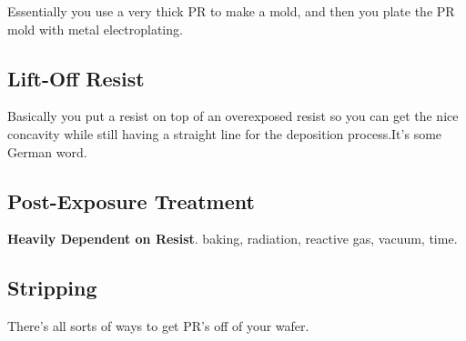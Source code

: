 \documentclass[fleqn]{report}
\begin{document}
Essentially you use a very thick PR to make a mold, and then you 
plate the PR mold with metal electroplating.


\subsection{Lift-Off Resist}
Basically you put a resist on top of an overexposed resist so 
you can get the nice concavity while still having a straight line for the 
deposition process.It's some German word.

\subsection{Post-Exposure Treatment}
\textbf{Heavily Dependent on Resist}.
baking, radiation, reactive gas, vacuum, time.

\subsection{Stripping}
There's all sorts of ways to get PR's off of your wafer.
\end{document}
